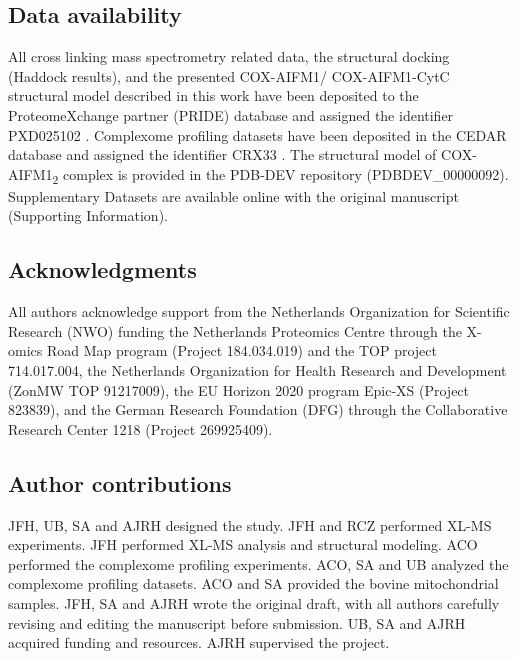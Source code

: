 \subsection*{Data availability}
All cross linking mass spectrometry related data, the structural docking (Haddock results), and the presented COX-AIFM1/ COX-AIFM1-CytC structural model described in this work have been deposited to the ProteomeXchange partner (PRIDE) database and assigned the identifier PXD025102 \cite{RN72}. Complexome profiling datasets have been deposited in the CEDAR database and assigned the identifier CRX33 \cite{RN73}. The structural model of COX-AIFM1\textsubscript{2} complex is provided in the PDB-DEV repository (PDBDEV\_00000092). Supplementary Datasets are available online with the original manuscript (Supporting Information).
%
\subsection*{Acknowledgments}
All authors acknowledge support from the Netherlands Organization for Scientific Research (NWO) funding the Netherlands Proteomics Centre through the X-omics Road Map program (Project 184.034.019) and the TOP project 714.017.004, the Netherlands Organization for Health Research and Development (ZonMW TOP 91217009), the EU Horizon 2020 program Epic-XS (Project 823839), and the German Research Foundation (DFG) through the Collaborative Research Center 1218 (Project 269925409).
%
\subsection*{Author contributions}
JFH, UB, SA and AJRH designed the study. JFH and RCZ performed XL-MS experiments. JFH performed XL-MS analysis and structural modeling. ACO performed the complexome profiling experiments. ACO, SA and UB analyzed the complexome profiling datasets. ACO and SA provided the bovine mitochondrial samples. JFH, SA and AJRH wrote the original draft, with all authors carefully revising and editing the manuscript before submission. UB, SA and AJRH acquired funding and resources. AJRH supervised the project.
%
